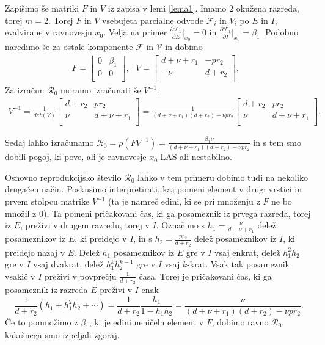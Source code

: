 \documentclass[a4paper,12pt]{article}
\newcommand{\R}{\mathcal R}
\newcommand{\F}{\mathcal F}
\newcommand{\V}{\mathcal V}
\begin{document}
Zapišimo še matriki \(F\) in \(V\) iz zapisa v lemi \ref{lema1}. Imamo \(2\) okužena razreda, torej \(m=2\). 
Torej \(F\) in \(V\) vsebujeta 
parcialne odvode \(\F_i\) in \(V_i\) po \(E\) in \(I\), evalvirane v ravnovesju \(x_0\). 
Velja na primer \(\frac{\partial \F_1}{\partial E}|_{x_0}=0\) in 
\(\frac{\partial \F_1}{\partial I}|_{x_0}=\beta_1\). Podobno naredimo še za ostale komponente \(\F\) in \(\V\) 
in dobimo 
\begin{align*}
    F= 
    \begin{bmatrix}
    0 & \beta_1 \\
    0 & 0 \\
    \end{bmatrix},\textrm{ }
    V=
        \begin{bmatrix}
        d+\nu+r_1 & -pr_2 \\
        -\nu & d+r_2 \\
        \end{bmatrix},\textrm{ }
\end{align*}
Za izračun \(\R_0\) moramo izračunati še \(V^{-1}\):
\begin{align*}
    V^{-1}=\frac{1}{det(V)}
    \begin{bmatrix}
    d+r_2 & pr_2 \\
    \nu & d+\nu+r_1 \\
    \end{bmatrix}=
    \frac{1}{(d+\nu+r_1)(d+r_2)-\nu pr_2}
    \begin{bmatrix}
        d+r_2 & pr_2 \\
        \nu & d+\nu+r_1 \\
    \end{bmatrix}.
\end{align*}

Sedaj lahko izračunamo \(\R_0=\rho(FV^{-1})=\frac{\beta_1\nu}{(d+\nu+r_1)(d+r_2)-\nu pr_2}\) 
in s tem smo dobili pogoj, ki pove, ali je ravnovesje \(x_0\) LAS ali nestabilno.

Osnovno reprodukcijsko število \(\R_0\) lahko v tem primeru dobimo tudi na nekoliko 
drugačen način. Poskusimo interpretirati, kaj pomeni element v drugi vrstici in prvem stolpcu 
matrike \(V^{-1}\) (ta je namreč edini, ki se pri množenju z \(F\) ne bo množil z \(0\)). 
Ta pomeni pričakovani čas, ki ga posameznik iz prvega razreda, torej iz \(E\), preživi v drugem razredu, torej v \(I\). 
Označimo s \(h_1=\frac{\nu}{d+\nu+r_1}\) delež posameznikov iz \(E\), ki preidejo v \(I\), in s 
\(h_2=\frac{pr_2}{d+r_2}\) delež posameznikov iz \(I\), ki preidejo nazaj v \(E\). 
Delež \(h_1\) posameznikov iz \(E\) gre v \(I\) vsaj enkrat, delež \(h_1^2h_2\) gre v \(I\) vsaj dvakrat, 
delež \(h_1^{k}h_2^{k-1}\) gre v \(I\) vsaj \(k\)-krat. 
Vsak tak posameznik vsakič v \(I\) preživi v povprečju \(\frac{1}{d+r_2}\) časa. Torej je pričakovani čas, ki ga 
posameznik iz razreda \(E\) preživi v \(I\) enak 
\[\frac{1}{d+r_2}(h_1+h_1^2h_2+\cdots)=\frac{1}{d+r_2}\frac{h_1}{1-h_1h_2}=\frac{\nu}{(d+\nu+r_1)(d+r_2)-\nu pr_2}.\]
Če to pomnožimo z \(\beta_1\), ki je edini neničeln element v \(F\), dobimo ravno \(\R_0\), kakršnega smo izpeljali zgoraj.
\end{document}
